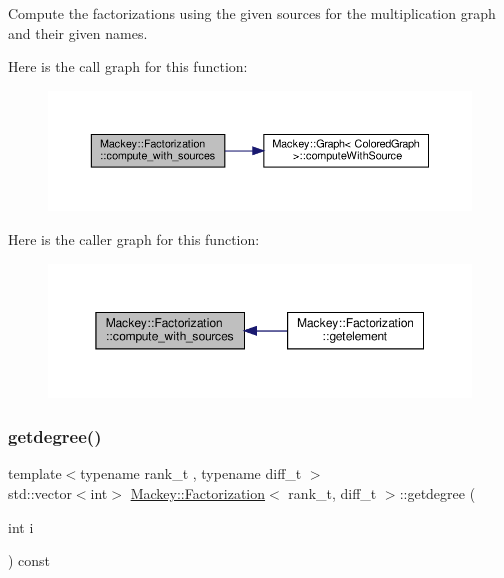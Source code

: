 Compute the factorizations using the given sources for the multiplication graph and their given names. 

Here is the call graph for this function\+:\nopagebreak
\begin{figure}[H]
\begin{center}
\leavevmode
\includegraphics[width=350pt]{classMackey_1_1Factorization_a2e135a37687fc3d69cd16a8729dd19eb_cgraph}
\end{center}
\end{figure}
Here is the caller graph for this function\+:\nopagebreak
\begin{figure}[H]
\begin{center}
\leavevmode
\includegraphics[width=350pt]{classMackey_1_1Factorization_a2e135a37687fc3d69cd16a8729dd19eb_icgraph}
\end{center}
\end{figure}
\mbox{\label{classMackey_1_1Factorization_a273e9318c0a5eacacd584474f93ffe4a}} 
\subsubsection{\texorpdfstring{getdegree()}{getdegree()}}
{\footnotesize\ttfamily template$<$typename rank\+\_\+t , typename diff\+\_\+t $>$ \\
std\+::vector$<$int$>$ \hyperlink{classMackey_1_1Factorization}{Mackey\+::\+Factorization}$<$ rank\+\_\+t, diff\+\_\+t $>$\+::getdegree (\begin{DoxyParamCaption}\item[{int}]{i }\end{DoxyParamCaption}) const\hspace{0.3cm}{\ttfamily [inline]}}



